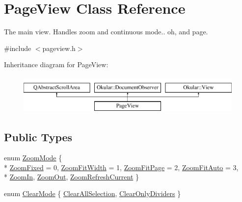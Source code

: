 \hypertarget{classPageView}{\section{Page\+View Class Reference}
\label{classPageView}
}


The main view. Handles zoom and continuous mode.. oh, and page.  




{\ttfamily \#include $<$pageview.\+h$>$}

Inheritance diagram for Page\+View\+:\begin{figure}[H]
\begin{center}
\leavevmode
\includegraphics[height=2.000000cm]{classPageView}
\end{center}
\end{figure}
\subsection*{Public Types}
\begin{DoxyCompactItemize}
\item 
enum \hyperlink{classPageView_af489dc2492677bb4f422660627f62aec}{Zoom\+Mode} \{ \\*
\hyperlink{classPageView_af489dc2492677bb4f422660627f62aeca282cef7e3408c3f6c1b83ec9694db066}{Zoom\+Fixed} = 0, 
\hyperlink{classPageView_af489dc2492677bb4f422660627f62aeca37b37e7554b8276eabe7310a11263664}{Zoom\+Fit\+Width} = 1, 
\hyperlink{classPageView_af489dc2492677bb4f422660627f62aecaa8ad8877fb7444b80d98c7871b5ee2fb}{Zoom\+Fit\+Page} = 2, 
\hyperlink{classPageView_af489dc2492677bb4f422660627f62aeca4021dc6ca422fa846e8c9c31e606cdbe}{Zoom\+Fit\+Auto} = 3, 
\\*
\hyperlink{classPageView_af489dc2492677bb4f422660627f62aecab2e658d672d8c9631d31502e6e748eda}{Zoom\+In}, 
\hyperlink{classPageView_af489dc2492677bb4f422660627f62aeca87c22d03f79c9cac97b85a7481c5e521}{Zoom\+Out}, 
\hyperlink{classPageView_af489dc2492677bb4f422660627f62aecab9583485dc9e9287fc1fc02392c5a47b}{Zoom\+Refresh\+Current}
 \}
\item 
enum \hyperlink{classPageView_a94ded93353c47276bfadb5ffc428a892}{Clear\+Mode} \{ \hyperlink{classPageView_a94ded93353c47276bfadb5ffc428a892acaa9219255254867e6ca9e31dff8fb8e}{Clear\+All\+Selection}, 
\hyperlink{classPageView_a94ded93353c47276bfadb5ffc428a892af8bc77b79de50cd32e76617e7f471354}{Clear\+Only\+Dividers}
 \}
\end{DoxyCompactItemize}
